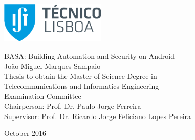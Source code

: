 \thispagestyle {empty}

\includegraphics[width=5.0cm]{Logo.png}

\begin{center}
%
\vspace{0.3cm}
 \vspace{5.0cm}

\vspace{0.8cm}
{\FontLb BASA: Building Automation and Security on Android} \\
\vspace{2.6cm}
{\FontMb João Miguel Marques Sampaio} \\
\vspace{1.9cm}
{\FontLn Thesis to obtain the Master of Science Degree in} \\
\vspace{0.3cm}
{\FontLb Telecommunications and Informatics Engineering} \\
\vspace{1.9cm}
{\FontMb Examination Committee} \\
\vspace{0.3cm}
{\FontSn %
Chairperson:        Prof. Dr. Paulo Jorge Ferreira \\
Supervisor:        Prof. Dr. Ricardo Jorge Feliciano Lopes Pereira \\
}
\vspace{1.5cm}

{\FontMb October 2016} \\
%
\end{center}

\cleardoublepage

\restoregeometry

